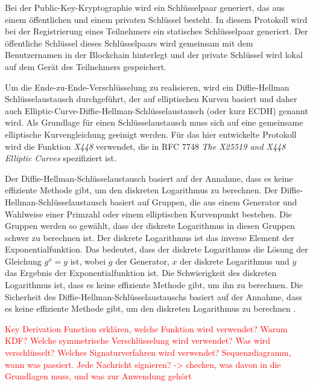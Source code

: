 Bei der Public-Key-Kryptographie wird ein Schlüsselpaar generiert, das aus einem öffentlichen und einem privaten Schlüssel besteht. In diesem Protokoll wird bei der Registrierung eines Teilnehmers ein statisches Schlüsselpaar generiert. Der öffentliche Schlüssel dieses Schlüsselpaars wird gemeinsam mit dem Benutzernamen in der Blockchain hinterlegt und der private Schlüssel wird lokal auf dem Gerät des Teilnehmers gespeichert.

Um die Ende-zu-Ende-Verschlüsselung zu realisieren, wird ein Diffie-Hellman Schlüsselaustausch durchgeführt, der auf elliptischen Kurven basiert und daher auch Elliptic-Curve-Diffie-Hellman-Schlüsselaustausch (oder kurz ECDH) genannt wird. Als Grundlage für einen Schlüsselaustausch muss sich auf eine gemeinsame elliptische Kurvengleichung geeinigt werden\Parencite[S. 118]{Wong_KryptoPraxis}. Für das hier entwickelte Protokoll wird die Funktion \textit{X448} verwendet, die in RFC 7748 \textit{The X25519 and X448 Elliptic Curves} \parencite{rfc_ellipticCurves} spezifiziert ist.

Der Diffie-Hellman-Schlüsselaustausch basiert auf der Annahme, dass es keine effiziente Methode gibt, um den diskreten Logarithmus zu berechnen. Der Diffie-Hellman-Schlüsselaustausch basiert auf Gruppen, die aus einem Generator und Wahlweise einer Primzahl oder einem elliptischen Kurvenpunkt bestehen. Die Gruppen werden so gewählt, dass der diskrete Logarithmus in diesen Gruppen schwer zu berechnen ist. Der diskrete Logarithmus ist das inverse Element der Exponentialfunktion. Das bedeutet, dass der diskrete Logarithmus die Lösung der Gleichung $g^x = y$ ist, wobei $g$ der Generator, $x$ der diskrete Logarithmus und $y$ das Ergebnis der Exponentialfunktion ist. Die Schwierigkeit des diskreten Logarithmus ist, dass es keine effiziente Methode gibt, um ihn zu berechnen. Die Sicherheit des Diffie-Hellman-Schlüsselaustauschs basiert auf der Annahme, dass es keine effiziente Methode gibt, um den diskreten Logarithmus zu berechnen \Parencite[S. 105-121]{Wong_KryptoPraxis}.

\textcolor{red}{Key Derivation Function erklären, welche Funktion wird verwendet? Warum KDF? Welche symmetrische Verschlüsselung wird verwendet? Was wird verschlüsselt? Welches Signaturverfahren wird verwendet? Sequenzdiagramm, wann was passiert. Jede Nachricht signieren? -> checken, was davon in die Grundlagen muss, und was zur Anwendung gehört}

